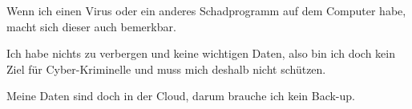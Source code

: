 \item Wenn ich einen Virus oder ein anderes Schadprogramm auf dem Computer habe, macht sich dieser auch bemerkbar.
\item Ich habe nichts zu verbergen und keine wichtigen Daten, also bin ich doch kein Ziel für Cyber-Kriminelle und muss mich deshalb nicht schützen.
\item Meine Daten sind doch in der Cloud, darum brauche ich kein Back-up.
